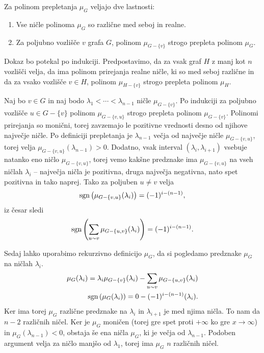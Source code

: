 \begin{izrek}
    Za polinom prepletanja \(\mu_G\) veljajo dve lastnosti:
    \begin{enumerate}
        \item Vse ničle polinoma \(\mu_G\) so različne med seboj in realne.
        \item Za poljubno vozlišče \(v\) grafa \(G\), polinom \(\mu_{G-\{v\}}\) strogo prepleta polinom \(\mu_G\).
    \end{enumerate}
\end{izrek}
\begin{dokaz}
    Dokaz bo potekal po indukciji. Predpostavimo, da za vsak graf \(H\) z manj kot \(n\) vozlišči velja, da ima polinom prirejanja realne ničle, ki so med seboj različne in da za vsako vozlišče \(v\in H\), polinom \(\mu_{H-\{v\}}\) strogo prepleta polinom \(\mu_H\).

    Naj bo \(v\in G\) in naj bodo \(\lambda_1 < \cdots < \lambda_{n-1}\) ničle \(\mu_{G-\{v\}}\). Po indukciji za poljubno vozlišče \(u\in G-\{v\}\) polinom \(\mu_{G-\{v, u\}}\) strogo prepleta polinom \(\mu_{G-\{v\}}\). Polinomi prirejanja so monični, torej zavzemajo le pozitivne vrednosti desno od njihove največje ničle. Po definiciji prepletanja je \(\lambda_{n-1}\) večja od največje ničle \(\mu_{G-\{v, u\}}\), torej velja \(\mu_{G-\{v, u\}}(\lambda_{n-1}) > 0\). Dodatno, vsak interval \((\lambda_i, \lambda_{i+1})\) vsebuje natanko eno ničlo \(\mu_{G-\{v, u\}}\), torej vemo kakšne predznake ima \(\mu_{G-\{v, u\}}\) na vseh ničlah \(\lambda_i\) -- največja ničla je pozitivna, druga največja negativna, nato spet pozitivna in tako naprej. Tako za poljuben \(u\neq v\) velja
    \begin{align*}
        \operatorname{sgn}\left({\mu_{G-\{v, u\}}(\lambda_i)}\right) = (-1)^{i-(n-1)},
    \end{align*}
    iz česar sledi
    \begin{align*}
        \operatorname{sgn}\left({\sum_{u\sim v} \mu_{G-\{u, v\}}(\lambda_i)}\right) = (-1)^{i - (n-1)}.
    \end{align*}

    Sedaj lahko uporabimo rekurzivno definicijo \(\mu_G\), da si pogledamo predznake \(\mu_G\) na ničlah \(\lambda_i\).
    \begin{align*}
        \mu_G(\lambda_i) = \lambda_i \mu_{G-\{v\}}(\lambda_i) - \sum_{u\sim v} \mu_{G-\{u, v\}}(\lambda_i) \\
        \operatorname{sgn}\left({\mu_G(\lambda_i)}\right) = 0 - (-1)^{i-(n-1)} (\lambda_i).
    \end{align*}
    Ker ima torej \(\mu_G\) različne predznake na \(\lambda_i\) in \(\lambda_{i+1}\) je med njima ničla. To nam da \(n-2\) različnih ničel. Ker je \(\mu_G\) moničen (torej gre spet proti \(+\infty\) ko gre \(x\to \infty\)) in \(\mu_G(\lambda_{n-1}) < 0\), obstaja še ena ničla \(\mu_G\), ki je večja od \(\lambda_{n-1}\). Podoben argument velja za ničlo manjšo od \(\lambda_1\), torej ima \(\mu_G\) \(n\) različnih ničel.
\end{dokaz}

